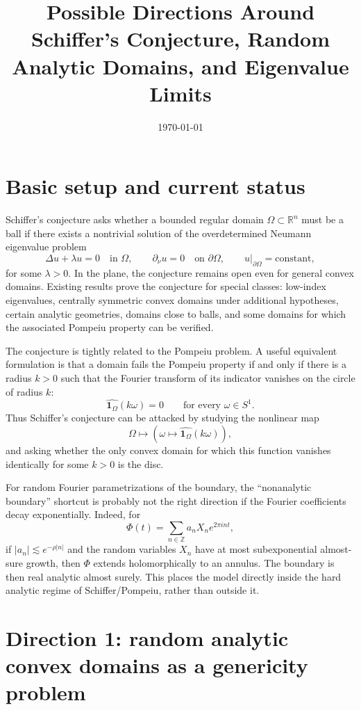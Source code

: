 \documentclass[11pt]{article}
\title{Possible Directions Around Schiffer's Conjecture, Random Analytic Domains, and Eigenvalue Limits}
\author{}
\date{\today}
\newcommand{\R}{\mathbb{R}}
\newcommand{\Om}{\Omega}
\newcommand{\1}{\mathbf 1}
\begin{document}
\maketitle

\section*{Basic setup and current status}

Schiffer's conjecture asks whether a bounded regular domain $\Om\subset\R^n$
must be a ball if there exists a nontrivial solution of the overdetermined
Neumann eigenvalue problem
\[
    \Delta u+\lambda u=0 \quad \text{in }\Om,\qquad
    \partial_\nu u=0 \quad \text{on }\partial\Om,\qquad
    u|_{\partial\Om}=\text{constant},
\]
for some $\lambda>0$. In the plane, the conjecture remains open even for
general convex domains. Existing results prove the conjecture for special
classes: low-index eigenvalues, centrally symmetric convex domains under
additional hypotheses, certain analytic geometries, domains close to balls, and
some domains for which the associated Pompeiu property can be verified.

The conjecture is tightly related to the Pompeiu problem. A useful equivalent
formulation is that a domain fails the Pompeiu property if and only if there is
a radius $k>0$ such that the Fourier transform of its indicator vanishes on the
circle of radius $k$:
\[
    \widehat{\1_\Om}(k\omega)=0
    \qquad \text{for every } \omega\in S^1 .
\]
Thus Schiffer's conjecture can be attacked by studying the nonlinear map
\[
    \Om \longmapsto
    \left(\omega\mapsto \widehat{\1_\Om}(k\omega)\right),
\]
and asking whether the only convex domain for which this function vanishes
identically for some $k>0$ is the disc.

For random Fourier parametrizations of the boundary, the ``nonanalytic boundary''
shortcut is probably not the right direction if the Fourier coefficients decay
exponentially. Indeed, for
\[
    \Phi(t)=\sum_{n\in\mathbb Z} a_n X_n e^{2\pi i n t},
\]
if $|a_n|\lesssim e^{-\rho |n|}$ and the random variables $X_n$ have at most
subexponential almost-sure growth, then $\Phi$ extends holomorphically to an
annulus. The boundary is then real analytic almost surely. This places the
model directly inside the hard analytic regime of Schiffer/Pompeiu, rather than
outside it.

\section*{Direction 1: random analytic convex domains as a genericity problem}
\end{document}
